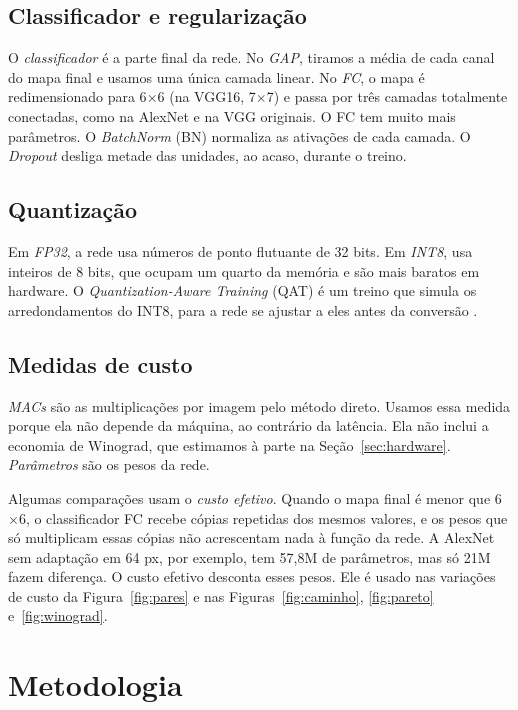 \documentclass[conference]{IEEEtran}
\newcommand{\by}{\ensuremath{\times}}
\begin{document}
\subsection{Classificador e regularização}

O \textit{classificador} é a parte final da rede. No \textit{GAP}, tiramos a média de cada canal do mapa final e usamos uma única camada linear.
No \textit{FC}, o mapa é redimensionado para 6\by6 (na VGG16, 7\by7) e passa por três camadas totalmente conectadas, como na AlexNet e na VGG originais. O
FC tem muito mais parâmetros. O \textit{BatchNorm} (BN) normaliza as ativações de cada camada. O \textit{Dropout} desliga metade das unidades, ao
acaso, durante o treino.

\subsection{Quantização}

Em \textit{FP32}, a rede usa números de ponto flutuante de 32 bits. Em \textit{INT8}, usa inteiros de 8 bits, que ocupam um quarto da memória e são
mais baratos em hardware. O \textit{Quantization-Aware Training} (QAT) é um treino que simula os arredondamentos do INT8, para a rede se ajustar a
eles antes da conversão \cite{jacob2018quantization}.

\subsection{Medidas de custo}

\textit{MACs} são as multiplicações por imagem pelo método direto. Usamos essa medida porque ela não depende da máquina, ao contrário da latência.
Ela não inclui a economia de Winograd, que estimamos à parte na Seção~\ref{sec:hardware}. \textit{Parâmetros} são os pesos da rede.

Algumas comparações usam o \textit{custo efetivo}. Quando o mapa final é menor que 6\by6, o classificador FC recebe cópias repetidas dos mesmos
valores, e os pesos que só multiplicam essas cópias não acrescentam nada à função da rede. A AlexNet sem adaptação em 64 px, por exemplo, tem 57,8M
de parâmetros, mas só 21M fazem diferença. O custo efetivo desconta esses pesos. Ele é usado nas variações de custo da Figura~\ref{fig:pares}
e nas Figuras~\ref{fig:caminho}, \ref{fig:pareto} e~\ref{fig:winograd}.

\section{Metodologia}
\label{sec:metodo}
\end{document}
